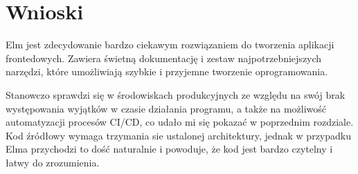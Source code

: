 \documentclass[twoside,a4paper]{report}
\begin{document}
\section{Wnioski}
Elm jest zdecydowanie bardzo ciekawym rozwiązaniem do tworzenia aplikacji frontedowych.
Zawiera świetną dokumentację i zestaw najpotrzebniejszych narzędzi, które umożliwiają szybkie i przyjemne tworzenie oprogramowania.

Stanowczo sprawdzi się w środowiskach produkcyjnych ze względu na swój brak występowania wyjątków w czasie działania programu, a także na możliwość automatyzacji procesów CI/CD, co udało mi się pokazać w poprzednim rozdziale.
Kod źródłowy wymaga trzymania sie ustalonej architektury, jednak w przypadku Elma przychodzi to dość naturalnie i powoduje, że kod jest bardzo czytelny i łatwy do zrozumienia.


\listoffigures
\lstlistoflistings{}

\printbibliography{}

\end{document}
